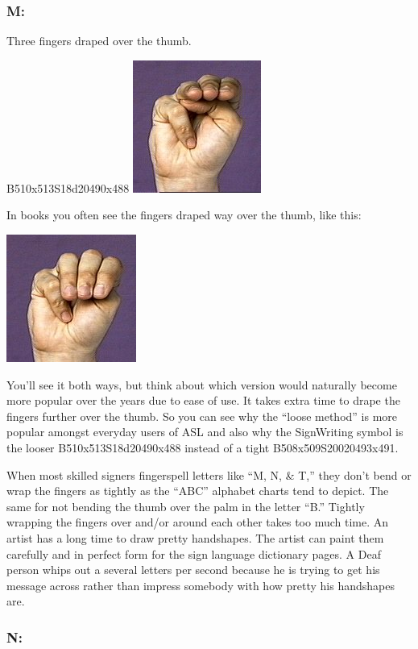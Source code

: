 \documentclass{article}
\begin{document}
\subsubsection{M:}

Three fingers draped over the thumb.

B510x513S18d20490x488
\includegraphics[scale=0.5]{images/m1.jpg}

In books you often see the fingers draped way over the thumb, like this:

\includegraphics[scale=0.5]{images/m2.jpg}

You'll see it both ways, but think about which version would naturally become more popular over the years due to ease of use.
It takes extra time to drape the fingers further over the thumb.
So you can see why the ``loose method'' is more popular amongst everyday users of ASL and also why the SignWriting symbol is the looser B510x513S18d20490x488 instead of a tight B508x509S20020493x491.

When most skilled signers fingerspell letters like ``M, N, \& T,'' they don't bend or wrap the fingers as tightly as the ``ABC'' alphabet charts tend to depict.
The same for not bending the thumb over the palm in the letter ``B.''
Tightly wrapping the fingers over and/or around each other takes too much time.
An artist has a long time to draw pretty handshapes.
The artist can paint them carefully and in perfect form for the sign language dictionary pages.
A Deaf person whips out a several letters per second because he is trying to get his message across rather than impress somebody with how pretty his handshapes are.

\subsubsection{N:}
\end{document}
